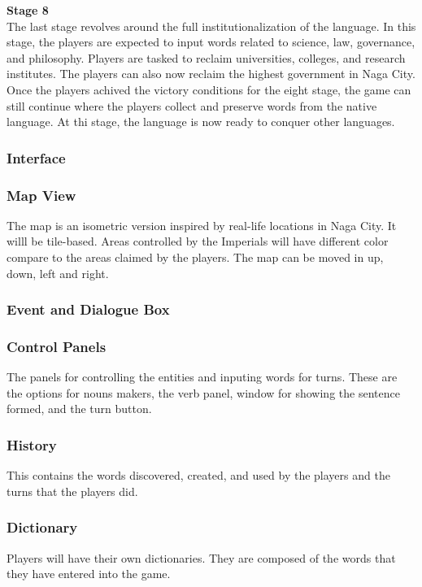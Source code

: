 \documentclass[11pt]{article}
\begin{document}
\textbf{Stage 8}\\
The last stage revolves around  the full institutionalization of the language. In this stage, the players are expected to input words related to science, law, governance, and philosophy. Players are tasked to reclaim universities, colleges, and research institutes. The players can also now reclaim the highest government in Naga City.\\

Once the players achived the victory conditions for the eight stage, the game can still continue where the players collect and preserve words from the native language. At thi stage, the language is now ready to conquer other languages.\\

\subsubsection{Interface}



\subsubsection{Map View}
The map is an isometric version inspired by real-life locations in Naga City. It willl be tile-based. Areas controlled by the Imperials will have different color compare to the areas claimed by the players. The map can be moved in up, down, left and right.

\subsubsection{Event and Dialogue Box}


\subsubsection{Control Panels}
The panels for controlling the entities and inputing words for turns. These are the options for nouns makers, the verb panel, window for showing the sentence formed, and the turn button.

\subsubsection{History}
This contains the words discovered, created, and used by the players and the turns that the players did.

\subsubsection{Dictionary}
Players will have their own dictionaries. They are composed of the words that they have entered into the game.
\end{document}
